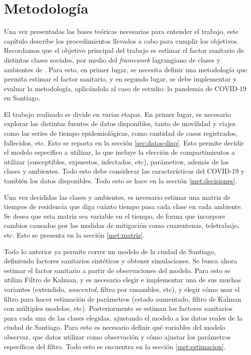 \chapter{Metodología} \label{chap:metod}

Una vez presentadas las bases teóricas necesarias para entender el trabajo, este capítulo describe los procedimientos llevados a cabo para cumplir los objetivos. Recordamos que el objetivo principal del trabajo es estimar el factor sanitario de distintas clases sociales, por medio del \textit{framework} lagrangiano de clases y ambientes de \cite{Bichara2018}. Para esto, en primer lugar, se necesita definir una metodología que permita estimar el factor sanitario, y en segundo lugar, se debe implementar y evaluar la metodología, aplicándola al caso de estudio: la pandemia de COVID-19 en Santiago. 

El trabajo realizado se divide en varias etapas. En primer lugar, es necesario explorar las distintas fuentes de datos disponibles, tanto de movilidad y viajes como las series de tiempo epidemiológicas, como cantidad de casos registrados, fallecidos, etc. Esto se reporta en la sección \ref{sec:datos-disp}. Esto permite decidir el modelo específico a utilizar, lo que incluye la elección de compartimientos a utilizar (susceptibles, expuestos, infectados, etc), parámetros, además de las clases y ambientes. Todo esto debe considerar las características del COVID-19 y también los datos disponibles. Todo esto se hace en la sección \ref{met:decisiones}.


Una vez decididas las clases y ambientes, es necesario estimar una matriz de tiempos de residencia que diga cuánto tiempo pasa cada clase en cada ambiente. Se desea que esta matriz sea variable en el tiempo, de forma que incorpore cambios causados por las medidas de mitigación como cuarentenas, teletrabajo, etc. Esto se presenta en la sección \ref{met:matriz}.

Todo lo anterior ya permite correr un modelo de la ciudad de Santiago, definiendo factores sanitarios sintéticos y obtener simulaciones. Se busca ahora estimar el factor sanitario a partir de observaciones del modelo. Para esto se utiliza Filtro de Kalman, y es necesario elegir e implementar una de sus muchas variantes (extendido, \textit{unscented}, filtro por ensambles, etc), y elegir cómo usar el filtro para hacer estimación de parámetros (estado aumentado, filtro de Kalman con múltiples modelos, etc). Posteriormente se estiman los factores sanitarios para cada una de las clases elegidas, ajustando el modelo a los datos reales de la ciudad de Santiago. Para esto es necesario definir qué variables del modelo observar, que datos utilizar como observación y cómo ajustar los parámetros específicos del filtro. Todo esto se encuentra en la sección \ref{met:estimacion}.

